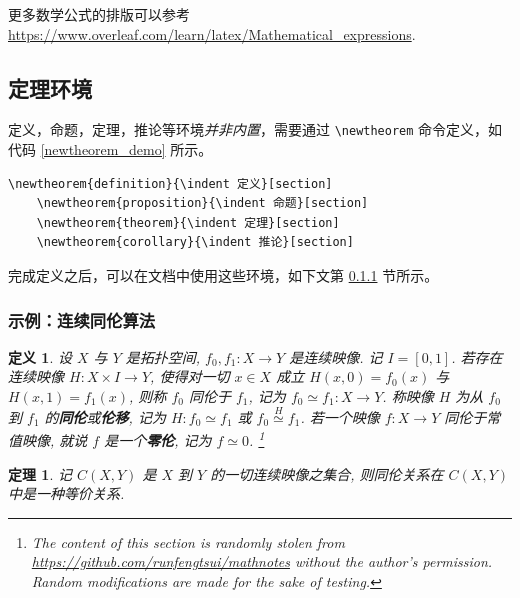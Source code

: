 \documentclass[12]{ctexart}
\begin{document}
更多数学公式的排版可以参考 \url{https://www.overleaf.com/learn/latex/Mathematical_expressions}.

\subsection{定理环境}

定义，命题，定理，推论等环境\emph{并非内置}，需要通过 \verb$\newtheorem$ 命令定义，如代码 \ref{newtheorem_demo} 所示。

\begin{lstlisting}[language=Tex, caption={Newtheorem example}, label={newtheorem_demo}]
    \newtheorem{definition}{\indent 定义}[section]
    \newtheorem{proposition}{\indent 命题}[section]
    \newtheorem{theorem}{\indent 定理}[section]
    \newtheorem{corollary}{\indent 推论}[section]
\end{lstlisting}

完成定义之后，可以在文档中使用这些环境，如下文第 \ref{sec_math_example} 节所示。

\subsubsection{示例：连续同伦算法}\label{sec_math_example}

\newtheorem{definition}{\indent 定义}[section]
\newtheorem{proposition}{\indent 命题}[section]
\newtheorem{theorem}{\indent 定理}[section]
\newtheorem{corollary}{\indent 推论}[section]

\begin{definition}
  设 \(X\) 与 \(Y\) 是拓扑空间, \(f_0,f_1:X\to Y\) 是连续映像. 记 \(I=[0,1]\). 若存在连续映像 \(H:X\times I\to Y\), 使得对一切 \(x\in X\) 成立 \(H(x,0)=f_0(x)\) 与 \(H(x,1)=f_1(x)\), 则称 \(f_0\) 同伦于 \(f_1\), 记为 \(f_0\simeq f_1:X\to Y\). 称映像 \(H\) 为从 \(f_0\) 到 \(f_1\) 的\textbf{同伦}或\textbf{伦移}, 记为 \(H:f_0\simeq f_1\) 或 \(f_0 \overset{H}{\simeq} f_1\). 若一个映像 \(f:X\to Y\) 同伦于常值映像, 就说 \(f\) 是一个\textbf{零伦}, 记为 \(f\simeq 0\).
  \footnote{The content of this section is randomly  stolen from \url{https://github.com/runfengtsui/mathnotes} \emph{without} the author's permission. Random modifications are made for the sake of testing.}
\end{definition}

\begin{theorem}
  记 \(C(X,Y)\) 是 \(X\) 到 \(Y\) 的一切连续映像之集合, 则同伦关系在 \(C(X,Y)\) 中是一种等价关系.
\end{theorem}
\end{document}
